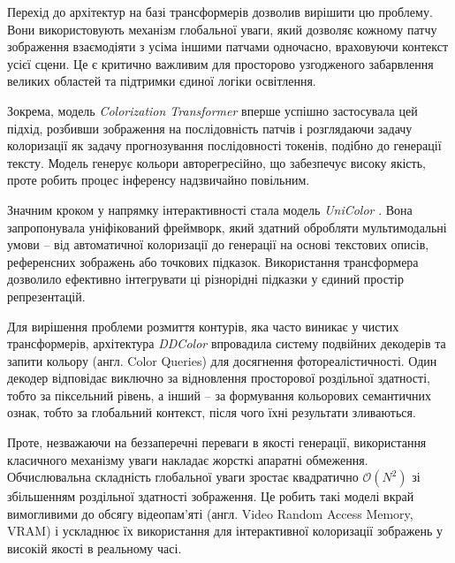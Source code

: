             Перехід до архітектур на базі трансформерів дозволив вирішити цю проблему.
            Вони використовують механізм глобальної уваги, який дозволяє кожному патчу зображення взаємодіяти з усіма іншими патчами одночасно, враховуючи контекст усієї сцени.
            Це є критично важливим для просторово узгодженого забарвлення великих областей та підтримки єдиної логіки освітлення.
            
            Зокрема, модель \textit{Colorization Transformer} \cite{2021-colorization-transformer} вперше успішно застосувала цей підхід, розбивши зображення на послідовність патчів і розглядаючи задачу колоризації як задачу прогнозування послідовності токенів, подібно до генерації тексту.
            Модель генерує кольори авторегресійно, що забезпечує високу якість, проте робить процес інференсу надзвичайно повільним.

            Значним кроком у напрямку інтерактивності стала модель \textit{UniColor} \cite{2022-unicolor}.
            Вона запропонувала уніфікований фреймворк, який здатний обробляти мультимодальні умови -- від автоматичної колоризації до генерації на основі текстових описів, референсних зображень або точкових підказок.
            Використання трансформера дозволило ефективно інтегрувати ці різнорідні підказки у єдиний простір репрезентацій.

            Для вирішення проблеми розмиття контурів, яка часто виникає у чистих трансформерів, архітектура \textit{DDColor} \cite{2023-ddcolor} впровадила систему подвійних декодерів та запити кольору (англ. Color Queries) для досягнення фотореалістичності.
            Один декодер відповідає виключно за відновлення просторової роздільної здатності, тобто за піксельний рівень, а інший -- за формування кольорових семантичних ознак, тобто за глобальний контекст, після чого їхні результати зливаються. 

            Проте, незважаючи на беззаперечні переваги в якості генерації, використання класичного механізму уваги накладає жорсткі апаратні обмеження.
            Обчислювальна складність глобальної уваги зростає квадратично $\mathcal{O}(N^2)$ зі збільшенням роздільної здатності зображення.
            Це робить такі моделі вкрай вимогливими до обсягу відеопам'яті (англ. Video Random Access Memory, $\mathrm{VRAM}$) і ускладнює їх використання для інтерактивної колоризації зображень у високій якості в реальному часі.

